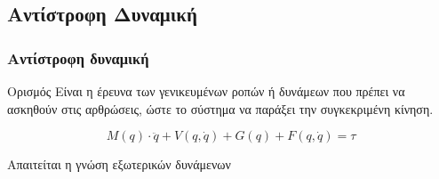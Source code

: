 \documentclass[8pt,sans,mathserif,aspectratio=43]{beamer}%
\begin{document}
\subsection{Αντίστροφη Δυναμική}
\begin{frame}
\frametitle{Αντίστροφη δυναμική}
    
    \begin{block}{Ορισμός}
           Είναι η έρευνα των γενικευμένων ροπών ή δυνάμεων που πρέπει να ασκηθούν στις αρθρώσεις, ώστε το σύστημα να παράξει την συγκεκριμένη κίνηση.
    \end{block}
    
    \pause
    
    \begin{equation*}
        M(q) \cdot \ddot{q} + V(q, \dot{q}) + G(q) + F(q, \dot{q}) = \tau
    \end{equation*}
    
    \pause
    
    \begin{center}
        \alert{Απαιτείται η γνώση εξωτερικών δυνάμενων}
    \end{center}
    
\end{frame}
\end{document}
